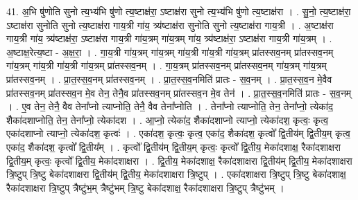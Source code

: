 \documentclass[17pt]{extarticle}
\begin{document}
41. अ॒भि षु॑णोति सुनो त्य॒भ्य॑भि षु॑णो त्य॒ष्टाक्ष॑रा॒ ऽष्टाक्ष॑रा सुनो त्य॒भ्य॑भि षु॑णो त्य॒ष्टाक्ष॑रा । . सु॒नो॒ त्य॒ष्टाक्ष॑रा॒ ऽष्टाक्ष॑रा सुनोति सुनो त्य॒ष्टाक्ष॑रा गाय॒त्री गा॑य॒ त्र्य॑ष्टाक्ष॑रा सुनोति सुनो त्य॒ष्टाक्ष॑रा गाय॒त्री । . अ॒ष्टाक्ष॑रा गाय॒त्री गा॑य॒ त्र्य॑ष्टाक्ष॑रा॒ ऽष्टाक्ष॑रा गाय॒त्री गा॑य॒त्रम् गा॑य॒त्रम् गा॑य॒ त्र्य॑ष्टाक्ष॑रा॒ ऽष्टाक्ष॑रा गाय॒त्री गा॑य॒त्रम् । . अ॒ष्टाक्ष॒रेत्य॒ष्टा - अ॒क्ष॒रा॒ । . गा॒य॒त्री गा॑य॒त्रम् गा॑य॒त्रम् गा॑य॒त्री गा॑य॒त्री गा॑य॒त्रम् प्रा॑तस्सव॒नम् प्रा॑तस्सव॒नम् गा॑य॒त्रम् गा॑य॒त्री गा॑य॒त्री गा॑य॒त्रम् प्रा॑तस्सव॒नम् । . गा॒य॒त्रम् प्रा॑तस्सव॒नम् प्रा॑तस्सव॒नम् गा॑य॒त्रम् गा॑य॒त्रम् प्रा॑तस्सव॒नम् । . प्रा॒त॒स्स॒व॒नम् प्रा॑तस्सव॒नम् । . प्रा॒त॒स्स॒व॒नमिति॑ प्रातः - स॒व॒नम् । . प्रा॒त॒स्स॒व॒न मे॒वैव प्रा॑तस्सव॒नम् प्रा॑तस्सव॒न मे॒व तेन॒ तेनै॒व प्रा॑तस्सव॒नम् प्रा॑तस्सव॒न मे॒व तेन॑ । . प्रा॒त॒स्स॒व॒नमिति॑ प्रातः - स॒व॒नम् । . ए॒व तेन॒ तेनै॒ वैव तेना᳚प्नो त्याप्नोति॒ तेनै॒ वैव तेना᳚प्नोति । . तेना᳚प्नो त्याप्नोति॒ तेन॒ तेना᳚प्नो॒ त्येका॑द॒ शैका॑दशाप्नोति॒ तेन॒ तेना᳚प्नो॒ त्येका॑दश । . आ॒प्नो॒ त्येका॑द॒ शैका॑दशाप्नो त्याप्नो॒ त्येका॑दश॒ कृत्वः॒ कृत्व॒ एका॑दशाप्नो त्याप्नो॒ त्येका॑दश॒ कृत्वः॑ । . एका॑दश॒ कृत्वः॒ कृत्व॒ एका॑द॒ शैका॑दश॒ कृत्वो᳚ द्वि॒तीय॑म् द्वि॒तीय॒म् कृत्व॒ एका॑द॒ शैका॑दश॒ कृत्वो᳚ द्वि॒तीय᳚म् । . कृत्वो᳚ द्वि॒तीय॑म् द्वि॒तीय॒म् कृत्वः॒ कृत्वो᳚ द्वि॒तीय॒ मेका॑दशाक्ष॒ रैका॑दशाक्षरा द्वि॒तीय॒म् कृत्वः॒ कृत्वो᳚ द्वि॒तीय॒ मेका॑दशाक्षरा । . द्वि॒तीय॒ मेका॑दशाक्ष॒ रैका॑दशाक्षरा द्वि॒तीय॑म् द्वि॒तीय॒ मेका॑दशाक्षरा त्रि॒ष्टुप् त्रि॒ष्टु
बेका॑दशाक्षरा द्वि॒तीय॑म् द्वि॒तीय॒ मेका॑दशाक्षरा त्रि॒ष्टुप् । . एका॑दशाक्षरा त्रि॒ष्टुप् त्रि॒ष्टु बेका॑दशाक्ष॒ रैका॑दशाक्षरा त्रि॒ष्टुप् त्रैष्टु॑भ॒म् त्रैष्टु॑भम् त्रि॒ष्टु बेका॑दशाक्ष॒ रैका॑दशाक्षरा त्रि॒ष्टुप् त्रैष्टु॑भम् । \newline
\end{document}
